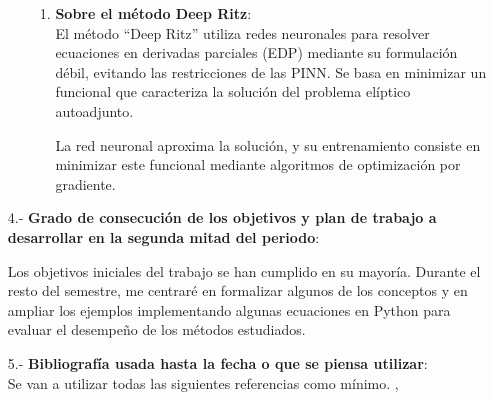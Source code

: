 \documentclass{article}
\begin{document}
\begin{enumerate}
\begin{itemize}
\begin{enumerate}
        \item \textbf{Sobre el método Deep Ritz}:\\
        El método ``Deep Ritz'' utiliza redes neuronales para resolver ecuaciones en derivadas parciales (EDP) mediante su formulación débil, evitando las restricciones de las PINN. Se basa en minimizar un funcional que caracteriza la solución del problema elíptico autoadjunto.

        La red neuronal aproxima la solución, y su entrenamiento consiste en minimizar este funcional mediante algoritmos de optimización por gradiente.
    \end{enumerate}
    
\end{itemize}

\item[4.-] {\bf Grado de consecuci\'on de los objetivos y plan de trabajo a desarrollar en la segunda mitad del periodo}:

Los objetivos iniciales del trabajo se han cumplido en su mayoría. Durante el resto del semestre, me centraré en formalizar algunos de los conceptos y en ampliar los ejemplos implementando algunas ecuaciones en Python para evaluar el desempeño de los métodos estudiados.

\item[5.-] {\bf Bibliograf\'ia usada hasta la fecha o que se piensa utilizar}: \\
Se van a utilizar todas las siguientes referencias como m\'inimo. 
\cite{aikawa2024improving},\cite{hou2023enhancing}\cite{pinkus1999approximation}\cite{lu2021deepxde}\cite{matsubara2023goodlatticetrainingphysicsinformed}\cite{subramanian2022adaptiveselfsupervisionalgorithmsphysicsinformed}\cite{krishnapriyan2021characterizingpossiblefailuremodes}\cite{c2021failure}\cite{grossmann2023physicsinformedneuralnetworksbeat}\cite{luo2023residualminimizationpdesfailure}\cite{e2017deepritzmethoddeep}\cite{mnzer2022curriculumtrainingbasedstrategydistributingcollocation}

\printbibliography
\cleardoublepage

\end{enumerate}
\end{document}
